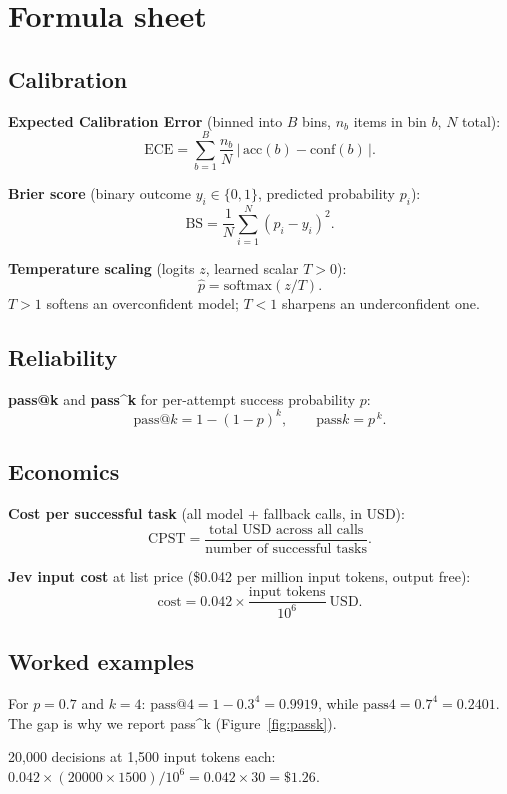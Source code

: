 \chapter{Formula sheet}
\label{app:formulas}

\section*{Calibration}

\textbf{Expected Calibration Error} (binned into $B$ bins, $n_b$ items in bin $b$, $N$ total):
\[
\mathrm{ECE} = \sum_{b=1}^{B} \frac{n_b}{N}\,\bigl|\,\mathrm{acc}(b) - \mathrm{conf}(b)\,\bigr|.
\]

\textbf{Brier score} (binary outcome $y_i\in\{0,1\}$, predicted probability $p_i$):
\[
\mathrm{BS} = \frac{1}{N}\sum_{i=1}^{N} (p_i - y_i)^2 .
\]

\textbf{Temperature scaling} (logits $z$, learned scalar $T>0$):
\[
\hat p = \mathrm{softmax}(z / T).
\]
$T>1$ softens an overconfident model; $T<1$ sharpens an underconfident one.

\section*{Reliability}

\textbf{pass@k} and \textbf{pass\^{}k} for per-attempt success probability $p$:
\[
\mathrm{pass@}k = 1 - (1-p)^k, \qquad \mathrm{pass\hat{}}k = p^{\,k}.
\]

\section*{Economics}

\textbf{Cost per successful task} (all model + fallback calls, in USD):
\[
\mathrm{CPST} = \frac{\text{total USD across all calls}}{\text{number of successful tasks}}.
\]

\textbf{Jev input cost} at list price (\$0.042 per million input tokens, output free):
\[
\mathrm{cost} = 0.042 \times \frac{\text{input tokens}}{10^6}\ \text{USD}.
\]

\section*{Worked examples}

\begin{worked}
For $p=0.7$ and $k=4$: $\mathrm{pass@}4 = 1-0.3^4 = 0.9919$, while
$\mathrm{pass\hat{}}4 = 0.7^4 = 0.2401$. The gap is why we report pass\^{}k
(Figure~\ref{fig:passk}).
\end{worked}

\begin{worked}
20{,}000 decisions at 1{,}500 input tokens each:
$0.042 \times (20000 \times 1500)/10^6 = 0.042 \times 30 = \$1.26$.
\end{worked}
